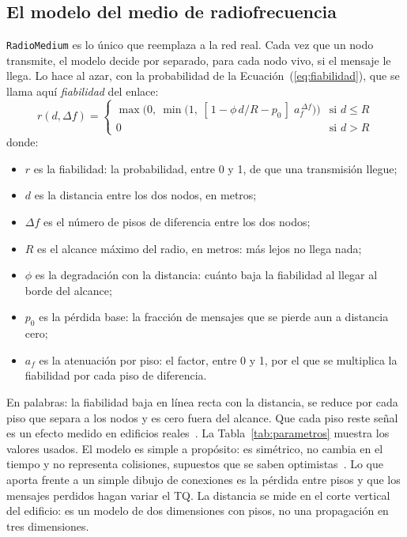 \subsection{El modelo del medio de radiofrecuencia}
\label{sec:medio}

\texttt{RadioMedium} es lo único que reemplaza a la red real. Cada vez que un
nodo transmite, el modelo decide por separado, para cada nodo vivo, si el
mensaje le llega. Lo hace al azar, con la probabilidad de la
Ecuación~(\ref{eq:fiabilidad}), que se llama aquí \textit{fiabilidad} del enlace:
\begin{equation}
r(d,\Delta f) =
\begin{cases}
\max\!\big(0,\ \min\!\big(1,\ [\,1 - \phi\, d/R - p_0\,]\; a_f^{\,\Delta f}\big)\big) & \text{si } d \le R \\
0 & \text{si } d > R
\end{cases}
\label{eq:fiabilidad}
\end{equation}
donde:
\begin{itemize}
\item $r$ es la fiabilidad: la probabilidad, entre 0 y 1, de que una transmisión
llegue;
\item $d$ es la distancia entre los dos nodos, en metros;
\item $\Delta f$ es el número de pisos de diferencia entre los dos nodos;
\item $R$ es el alcance máximo del radio, en metros: más lejos no llega nada;
\item $\phi$ es la degradación con la distancia: cuánto baja la fiabilidad al
llegar al borde del alcance;
\item $p_0$ es la pérdida base: la fracción de mensajes que se pierde aun a
distancia cero;
\item $a_f$ es la atenuación por piso: el factor, entre 0 y 1, por el que se
multiplica la fiabilidad por cada piso de diferencia.
\end{itemize}

En palabras: la fiabilidad baja en línea recta con la distancia, se reduce por
cada piso que separa a los nodos y es cero fuera del alcance. Que cada piso
reste señal es un efecto medido en edificios
reales~\cite{Seidel1992Multifloor}. La Tabla~\ref{tab:parametros} muestra los
valores usados. El modelo es simple a propósito: es simétrico, no cambia en el
tiempo y no representa colisiones, supuestos que se saben
optimistas~\cite{Kotz2004Assumptions}. Lo que aporta frente a un simple dibujo
de conexiones es la pérdida entre pisos y que los mensajes perdidos hagan
variar el TQ. La distancia se mide en el corte vertical del edificio: es un
modelo de dos dimensiones con pisos, no una propagación en tres dimensiones.

